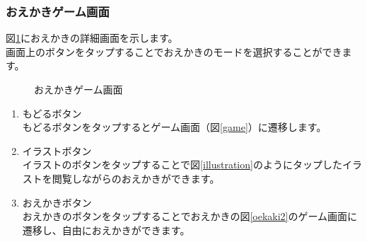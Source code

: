 \documentclass[a4j]{jarticle}
\begin{document}
\newpage
\subsubsection{おえかきゲーム画面}
図\ref{oekaki}におえかきの詳細画面を示します。\\
画面上のボタンをタップすることでおえかきのモードを選択することができます。\\

\begin{figure}[H]
    \begin{center}
    \caption {おえかきゲーム画面}
    \label{oekaki}
    \end{center}
\end{figure}

\begin{enumerate}
  \renewcommand{\labelenumi}{\textcircled{\scriptsize \theenumi}}
\item もどるボタン\\
  もどるボタンをタップするとゲーム画面（図\ref{game}）に遷移します。
\item イラストボタン\\
  イラストのボタンをタップすることで図\ref{illustration}のようにタップしたイラストを閲覧しながらのおえかきができます。
\item おえかきボタン\\
  おえかきのボタンをタップすることでおえかきの図\ref{oekaki2}のゲーム画面に遷移し、自由におえかきができます。
\end{enumerate}
\end{document}
